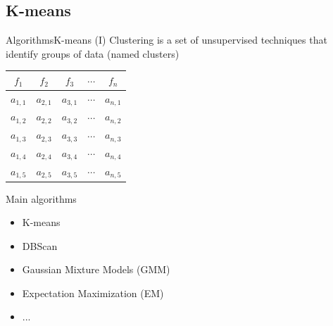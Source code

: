 \documentclass[10pt,compress]{beamer} %
\begin{document}
\subsection{K-means}
\begin{frame}{Algorithms}{K-means (I)}
	Clustering is a set of unsupervised techniques that identify groups of data (named \alert{clusters})
	\begin{center}
	\begin{tabular}{ccccc}\hline
		 $f_1$     & $f_2$     & $f_3$     & $\cdots$ & $f_n$     \\\hline
		 $a_{1,1}$ & $a_{2,1}$ & $a_{3,1}$ & $\cdots$ & $a_{n,1}$ \\
		 $a_{1,2}$ & $a_{2,2}$ & $a_{3,2}$ & $\cdots$ & $a_{n,2}$ \\
		 $a_{1,3}$ & $a_{2,3}$ & $a_{3,3}$ & $\cdots$ & $a_{n,3}$ \\
		 $a_{1,4}$ & $a_{2,4}$ & $a_{3,4}$ & $\cdots$ & $a_{n,4}$ \\
		 $a_{1,5}$ & $a_{2,5}$ & $a_{3,5}$ & $\cdots$ & $a_{n,5}$ \\
		 \hline
	 \end{tabular}
	 \end{center}

     Main algorithms
		\begin{itemize}
			\item K-means
            \item DBScan
            \item Gaussian Mixture Models (GMM)
            \item Expectation Maximization (EM)
            \item ...
		\end{itemize}

\end{frame}
\end{document}
